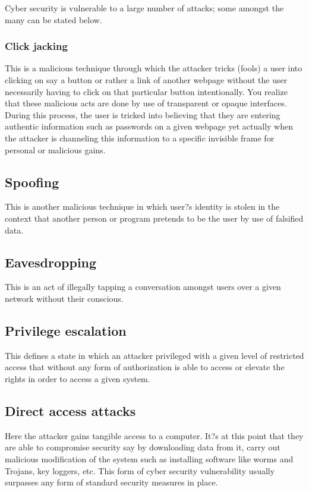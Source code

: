 \documentclass[10pt,a4paper]{report}
\begin{document}
\begin{flushleft}
	Cyber security is vulnerable to a large number of attacks; some amongst the many can be stated below.
	
	\subsubsection{	Click jacking}\linebreak
	This is a malicious technique through which the attacker tricks (fools) a user into clicking on say a button or rather a link of another webpage without the user necessarily having to click on that particular button intentionally. You realize that these malicious acts are done by use of transparent or opaque interfaces. During this process, the user is tricked into believing that they are entering authentic information such as passwords on a given webpage yet actually when the attacker is channeling this information to a specific invisible frame for personal or malicious gains.
	
		\subsection{Spoofing}\linebreak
	This is another malicious technique in which user?s identity is stolen in the context that another person or program pretends to be the user by use of falsified data.
	
	\subsection{	Eavesdropping}\linebreak
	This is an act of illegally tapping a conversation amongst users over a given network without their conscious.
	
		\subsection{Privilege escalation}\linebreak
	This defines a state in which an attacker privileged with a given level of restricted access that without any form of authorization is able to access or elevate the rights in order to access a given system.
	
		\subsection{Direct access attacks}\linebreak[2]
	Here the attacker gains tangible access to a computer. It?s at this point that they are able to compromise security say by downloading data from it, carry out malicious modification of the system such as installing software like worms and 	Trojans, key loggers, etc. This form of cyber security vulnerability usually surpasses any form of standard security measures in place.\linebreak[8]
	

\end{flushleft}
\end{document}

